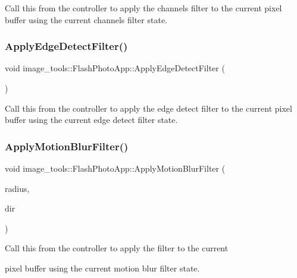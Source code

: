 Call this from the controller to apply the channels filter to the current pixel buffer using the current channels filter state. \mbox{\label{classimage__tools_1_1FlashPhotoApp_ae58e5cfde20b6834ac92310f2a267658}} 
\subsubsection{\texorpdfstring{Apply\+Edge\+Detect\+Filter()}{ApplyEdgeDetectFilter()}}
{\footnotesize\ttfamily void image\+\_\+tools\+::\+Flash\+Photo\+App\+::\+Apply\+Edge\+Detect\+Filter (\begin{DoxyParamCaption}{ }\end{DoxyParamCaption})}

Call this from the controller to apply the edge detect filter to the current pixel buffer using the current edge detect filter state. \mbox{\label{classimage__tools_1_1FlashPhotoApp_aa09e633c5a2e34bf1ccf2259012011ba}} 
\subsubsection{\texorpdfstring{Apply\+Motion\+Blur\+Filter()}{ApplyMotionBlurFilter()}}
{\footnotesize\ttfamily void image\+\_\+tools\+::\+Flash\+Photo\+App\+::\+Apply\+Motion\+Blur\+Filter (\begin{DoxyParamCaption}\item[{float}]{radius,  }\item[{\hyperlink{classimage__tools_1_1ImageEditor_a20bacf2756f1b97eed82d2fee9628ac2}{Image\+Editor\+::\+M\+Blur\+Dir}}]{dir }\end{DoxyParamCaption})}

Call this from the controller to apply the filter to the current

pixel buffer using the current motion blur filter state. \mbox{\label{classimage__tools_1_1FlashPhotoApp_a960f826e98d590b80c4619916a945303}} 
